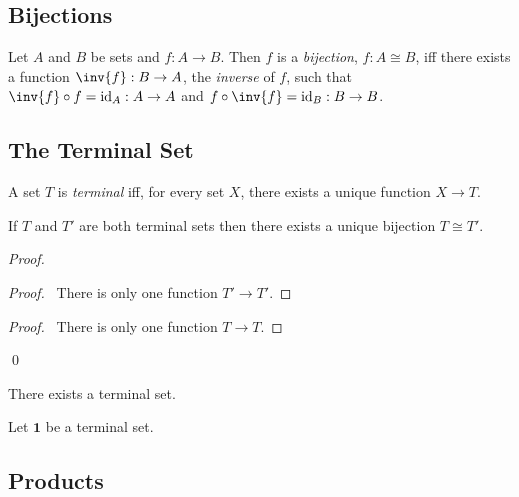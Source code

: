 \subsection{Bijections}

\begin{df}[Bijection]
  Let $A$ and $B$ be sets and $f : A \rightarrow B$. Then $f$ is a 
  \emph{bijection}, $f : A \cong B$, iff there exists a function $\inv{f} : B 
  \rightarrow A$, the \emph{inverse} of $f$, such that $\inv{f} \circ f = \id{A} 
  : 
  A \rightarrow A$ and $f \circ \inv{f} = \id{B} : B \rightarrow B$.
\end{df}

\subsection{The Terminal Set}

\begin{df}
  A set $T$ is \emph{terminal} iff, for every set $X$, there exists a unique 
  function $X \rightarrow T$.
\end{df}

\begin{thm}
  If $T$ and $T'$ are both terminal sets then there exists a unique bijection $T 
  \cong T'$.
\end{thm}

\begin{proof}
  \pf
  \begin{proof}
    \pf\ There is only one function $T' \rightarrow T'$.
  \end{proof}
  \begin{proof}
    \pf\ There is only one function $T \rightarrow T$.
  \end{proof}
  \qed
\end{proof}

\begin{ax}
  There exists a terminal set.
\end{ax}

\begin{df}
  Let $\mathbf{1}$ be a terminal set.
\end{df}

\subsection{Products}

